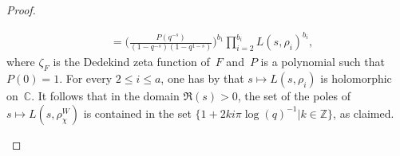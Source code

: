 \documentclass[a4paper,english,12pt]{amsart}
\newcommand{\QQ}{\mathbb{Q}}
\newcommand{\CC}{\mathbb{C}}
\newcommand{\oF}{\overline F}
\newcommand{\ZZ}{\mathbb{Z}}
\newcommand{\wchi}{\widetilde{\chi}}
\DeclareMathOperator{\GL}{GL}
\newtheorem{lem}[equation]{Lemma}
\numberwithin{equation}{subsection}
\begin{document}
\begin{proof}
\begin{enumerate}
\begin{align*}
&=\bigg(\frac{P(q^{-s})}{(1-q^{-s})(1-q^{1-s})}\bigg)^{b_1}\prod_{i=2}^{b_i}L(s,\rho_i)^{b_i},
\end{align*}
where $\zeta_F$ is the Dedekind zeta function of~$F$ and~$P$ is a polynomial such that $P(0)=1$. For every $2\leq i\leq a$, one has by \cite[Pages 196-197]{Milne} that $s\mapsto L(s,\rho_i)$ is holomorphic on~$\CC$. It follows that in the domain $\Re(s)>0$, the set of the poles of $s\mapsto L(s,\rho^W_{\chi})$ is contained in the set $\{1+2ki\pi\log(q)^{-1}|k\in\ZZ\}$, as claimed.
\end{enumerate}
\end{proof}
\end{document}
